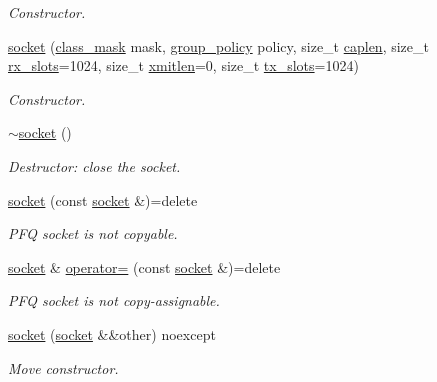 \begin{DoxyCompactItemize}
\begin{DoxyCompactList}\small\item\em Constructor. \end{DoxyCompactList}\item 
\hyperlink{classpfq_1_1socket_a6cee87008b62d69f564743e63938e017}{socket} (\hyperlink{namespacepfq_a96af1f5ed530eff563eb917516758fbb}{class\+\_\+mask} mask, \hyperlink{namespacepfq_ac41249c8510558905b01fa4d866a38d7}{group\+\_\+policy} policy, size\+\_\+t \hyperlink{classpfq_1_1socket_ab68dbba5ef01041b9c96758c4a9f0a6c}{caplen}, size\+\_\+t \hyperlink{classpfq_1_1socket_a5cf700fc12d67b91df3d669ac4aa737a}{rx\+\_\+slots}=1024, size\+\_\+t \hyperlink{classpfq_1_1socket_a142d9760fcef01b426c3afb4005400d9}{xmitlen}=0, size\+\_\+t \hyperlink{classpfq_1_1socket_a019d15a072c043d6a1333ca0c836da4c}{tx\+\_\+slots}=1024)
\begin{DoxyCompactList}\small\item\em Constructor. \end{DoxyCompactList}\item 
\hyperlink{classpfq_1_1socket_a08fbdcc1736de36d205282ce20ffbaa3}{$\sim$socket} ()
\begin{DoxyCompactList}\small\item\em Destructor\+: close the socket. \end{DoxyCompactList}\item 
\hyperlink{classpfq_1_1socket_a517b6fdd622cdb2a64f2960176296f8d}{socket} (const \hyperlink{classpfq_1_1socket}{socket} \&)=delete
\begin{DoxyCompactList}\small\item\em P\+FQ socket is not copyable. \end{DoxyCompactList}\item 
\hyperlink{classpfq_1_1socket}{socket} \& \hyperlink{classpfq_1_1socket_a3cfd9674358a2ffd8b37e76d73b8a654}{operator=} (const \hyperlink{classpfq_1_1socket}{socket} \&)=delete
\begin{DoxyCompactList}\small\item\em P\+FQ socket is not copy-\/assignable. \end{DoxyCompactList}\item 
\hyperlink{classpfq_1_1socket_a1a60820551f1601beb54649d9ae48fa2}{socket} (\hyperlink{classpfq_1_1socket}{socket} \&\&other) noexcept
\begin{DoxyCompactList}\small\item\em Move constructor. \end{DoxyCompactList}\item 

\end{DoxyCompactItemize}
